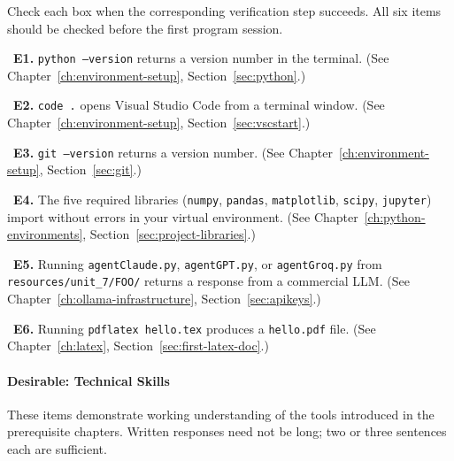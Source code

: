 \begin{Form}
Check each box when the corresponding verification step succeeds.
All six items should be checked before the first program session.

\vs

\noindent\CheckBox[name=e1,width=0.4cm,height=0.4cm]{}~\textbf{E1.}
\texttt{python --version} returns a version number in the terminal.
(See Chapter~\ref{ch:environment-setup}, Section~\ref{sec:python}.)

\vs

\noindent\CheckBox[name=e2,width=0.4cm,height=0.4cm]{}~\textbf{E2.}
\texttt{code .} opens Visual Studio Code from a terminal window.
(See Chapter~\ref{ch:environment-setup}, Section~\ref{sec:vscstart}.)

\vs

\noindent\CheckBox[name=e3,width=0.4cm,height=0.4cm]{}~\textbf{E3.}
\texttt{git --version} returns a version number.
(See Chapter~\ref{ch:environment-setup}, Section~\ref{sec:git}.)

\vs

\noindent\CheckBox[name=e4,width=0.4cm,height=0.4cm]{}~\textbf{E4.}
The five required libraries (\texttt{numpy}, \texttt{pandas},
\texttt{matplotlib}, \texttt{scipy}, \texttt{jupyter}) import
without errors in your virtual environment.
(See Chapter~\ref{ch:python-environments},
Section~\ref{sec:project-libraries}.)

\vs

\noindent\CheckBox[name=e5,width=0.4cm,height=0.4cm]{}~\textbf{E5.}
Running \texttt{agentClaude.py}, \texttt{agentGPT.py}, or
\texttt{agentGroq.py} from \texttt{resources/unit\_7/FOO/} returns
a response from a commercial LLM.
(See Chapter~\ref{ch:ollama-infrastructure},
Section~\ref{sec:apikeys}.)

\vs

\noindent\CheckBox[name=e6,width=0.4cm,height=0.4cm]{}~\textbf{E6.}
Running \texttt{pdflatex hello.tex} produces a \texttt{hello.pdf}
file.
(See Chapter~\ref{ch:latex}, Section~\ref{sec:first-latex-doc}.)

\paragraph{Desirable: Technical Skills}
\label{sec:assess-desirable}

These items demonstrate working understanding of the tools introduced
in the prerequisite chapters. Written responses need not be long;
two or three sentences each are sufficient.


\end{Form}
